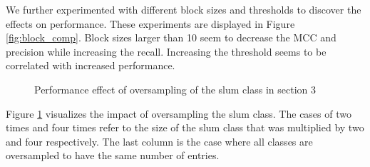 We further experimented with different block sizes and thresholds to discover the effects on performance. These experiments are displayed in Figure \ref{fig:block_comp}. Block sizes larger than 10 seem to decrease the MCC and precision while increasing the recall. Increasing the threshold seems to be correlated with increased performance.

\clearpage
{}\dataoversampling

\begin{figure}[ht]
    \centering
    \caption{Performance effect of oversampling of the slum class in section 3}
\label{fig:oversampling_comp}
\end{figure}

Figure \ref{fig:oversampling_comp} visualizes the impact of oversampling the slum class. The cases of two times and four times refer to the size of the slum class that was multiplied by two and four respectively. The last column is the case where all classes are oversampled to have the same number of entries.

